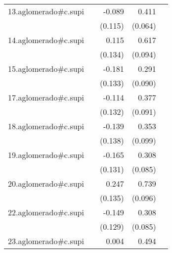 {\begin{longtable}{l*{4}{D{.}{.}{-1}}}
\addlinespace
13.aglomerado#c.supi&                     &      -0.089         &       0.411\sym{***}&                     \\
            &                     &     (0.115)         &     (0.064)         &                     \\
\addlinespace
14.aglomerado#c.supi&                     &       0.115         &       0.617\sym{***}&                     \\
            &                     &     (0.134)         &     (0.094)         &                     \\
\addlinespace
15.aglomerado#c.supi&                     &      -0.181         &       0.291\sym{**} &                     \\
            &                     &     (0.133)         &     (0.090)         &                     \\
\addlinespace
17.aglomerado#c.supi&                     &      -0.114         &       0.377\sym{***}&                     \\
            &                     &     (0.132)         &     (0.091)         &                     \\
\addlinespace
18.aglomerado#c.supi&                     &      -0.139         &       0.353\sym{***}&                     \\
            &                     &     (0.138)         &     (0.099)         &                     \\
\addlinespace
19.aglomerado#c.supi&                     &      -0.165         &       0.308\sym{***}&                     \\
            &                     &     (0.131)         &     (0.085)         &                     \\
\addlinespace
20.aglomerado#c.supi&                     &       0.247         &       0.739\sym{***}&                     \\
            &                     &     (0.135)         &     (0.096)         &                     \\
\addlinespace
22.aglomerado#c.supi&                     &      -0.149         &       0.308\sym{***}&                     \\
            &                     &     (0.129)         &     (0.085)         &                     \\
\addlinespace
23.aglomerado#c.supi&                     &       0.004         &       0.494\sym{***}&                     \\

\end{longtable}}
